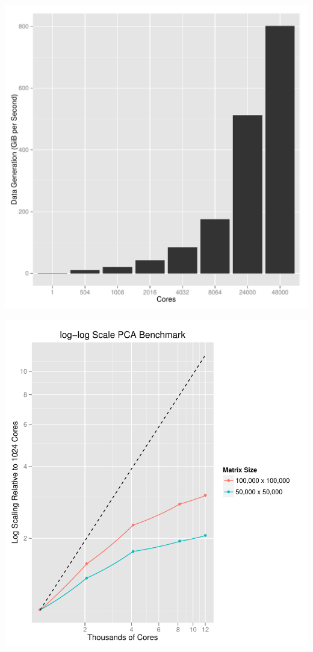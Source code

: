 \begin{frame}
  \begin{block}{}
  \begin{center}
    \includegraphics[height=.88\textheight]{../common/pics/benchmarks/datagen24k}
  \end{center}
  \end{block}
\end{frame}

\begin{frame}
  \begin{block}{}
  \begin{center}
    \includegraphics[height=.88\textheight]{../common/pics/benchmarks/pca_scaling}
  \end{center}
  \end{block}
\end{frame}